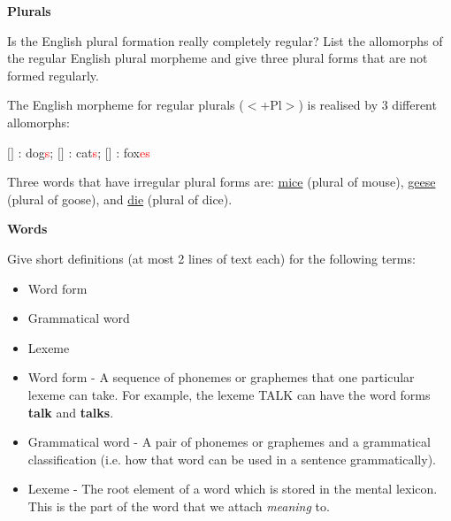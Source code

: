 \documentclass[11pt]{article}
\begin{document}
\vspace*{0.5cm} %

\begin{problem}{2}
\textbf{Plurals}

Is the English plural formation really completely regular? List the allomorphs of the regular English plural morpheme and give three plural forms that are not formed regularly.
\end{problem}

\begin{solution}
The English morpheme for regular plurals ($<$+Pl$>$) is realised by 3 different allomorphs:
\begin{center}
$[$$]$ : dog\textcolor{red}{s}; $[$$]$ : cat\textcolor{red}{s}; $[$$]$ : fox\textcolor{red}{es}
\end{center}
Three words that have irregular plural forms are: \underline{mice} (plural of mouse), \underline{geese} (plural of goose), and \underline{die} (plural of dice). 

\end{solution}

\vspace*{0.5cm}

\begin{problem}{3}
\textbf{Words}

Give short definitions (at most 2 lines of text each) for the following terms:
\begin{itemize}
	\item Word form
	\item Grammatical word
	\item Lexeme
\end{itemize}

\end{problem}

\begin{solution}
\begin{itemize}
	\item Word form - A sequence of phonemes or graphemes that one particular lexeme can take.  For example, the lexeme TALK can have the word forms \textbf{talk} and \textbf{talks}.
	\item Grammatical word - A pair of phonemes or graphemes and a grammatical classification (i.e. how that word can be used in a sentence grammatically).
	\item Lexeme - The root element of a word which is stored in the mental lexicon.  This is the part of the word that we attach \textit{meaning} to.
\end{itemize}
\end{solution}
\end{document}
